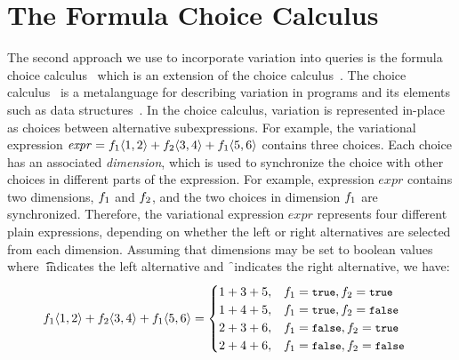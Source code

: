 \section{The Formula Choice Calculus}
\label{sec:fcc}



The second approach we use to incorporate variation into queries is
the formula choice calculus~\cite{HW16fosd} which is an extension of 
the choice calculus~\cite{Walk13thesis,EW11tosem}. 
%
The choice calculus~\cite{Walk13thesis,EW11tosem} is a metalanguage for
describing variation in programs and its elements such as data 
structures~\cite{Walk14onward,EWC13fosd}.
In the choice calculus, variation is represented in-place as
choices between alternative subexpressions. For example, 
the variational expression 
$\mathit{expr} = \chc [\A] {1,2} + \chc [\B] {3,4} + \chc [\A] {5,6}$
 contains three choices.
Each choice has an associated \emph{dimension}, which is used to
synchronize the choice with other choices in different parts
of the expression. For example, expression $\mathit{expr}$ contains
two dimensions, $\A$ and $\B$, and the two choices in dimension
$\A$ are synchronized. Therefore, the variational expression
$\mathit{expr}$ represents four different plain expressions, depending
on whether the left or right alternatives are selected from each
dimension. Assuming that dimensions may be set to boolean values
where \t\ indicates the left alternative and \f\ indicates the
right alternative, we have: 
\begin{alignat*}{1}
\chc [\A] {1,2} + \chc [\B] {3,4} + \chc [\A] {5,6} &=
\begin{cases}
  1+3+5,& \A =\t, \B = \t\\
  1+4+5,& \A =\t, \B = \f\\
  2+3+6,& \A =\f, \B = \t\\
  2+4+6,& \A =\f, \B = \f
\end{cases}
\end{alignat*}
